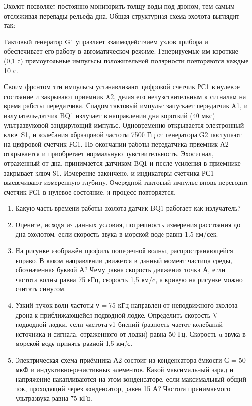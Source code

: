 
Эхолот позволяет постоянно мониторить толщу воды под дроном, тем самым отслеживая перепады рельефа дна. Общая структурная схема эхолота выглядит так:


Тактовый генератор G1 управляет взаимодействием узлов прибора и обеспечивает его работу в автоматическом режиме. 
Генерируемые им короткие (0,1 с) прямоугольные импульсы положительной полярности повторяются каждые 10 с.

Своим фронтом эти импульсы устанавливают цифровой счетчик РС1 в нулевое состояние и закрывают приемник А2, 
делая его нечувствительным к сигналам на время работы передатчика. Спадом тактовый импульс запускает передатчик 
А1, и излучатель-датчик BQ1 излучает в направлении дна короткий (40 мкс) ультразвуковой зондирующий импульс. 
Одновременно открывается электронный ключ S1, и колебания образцовой частоты 7500 Гц от генератора G2 поступают 
на цифровой счетчик РС1. По окончании работы передатчика приемник А2 открывается и приобретает нормальную 
чувствительность. Эхосигнал, отраженный от дна, принимается датчиком BQ1 и после усиления в приемнике 
закрывает ключ S1. Измерение закончено, и индикаторы счетчика РС1 высвечивают измеренную глубину. Очередной 
тактовый импульс вновь переводит счетчик РС1 в нулевое состояние, и процесс повторяется.

\begin{enumerate}
    \item Какую часть времени работы эхолота датчик BQ1 работает как излучатель?
    \item Оцените, исходя из данных условия, погрешность измерения расстояния до дна эхолотом, если скорость звука в морской воде равна 1.5 км/сек. 
    \item На рисунке изображён профиль поперечной волны, распространяющейся вправо. В каком направлении движется в данный момент частица среды, обозначенная буквой А? Чему равна скорость движения точки А, если частота волны равна 75 кГц, скорость 1,5 км/c, а кривую на рисунке можно считать синусом.
    

    \item Узкий пучок волн частоты ν = 75 кГц направлен от неподвижного эхолота дрона к приближающейся подводной лодке. Определить скорость V подводной лодки, если частота ν1 биений (разность частот колебаний источника и сигнала, отраженного от лодки) равна 50 Гц. Скорость u звука в морской воде принять равной 1,5 км/с.
    \item Электрическая схема приёмника А2 состоит из конденсатора ёмкости С = 50 мкФ и индуктивно-резистивных элементов. Какой максимальный заряд и напряжение накапливаются на этом конденсаторе, если максимальный общий ток, проходящий через конденсатор, равен 15 А? Частота принимаемого ультразвука равна 75 кГц.
    
\end{enumerate}